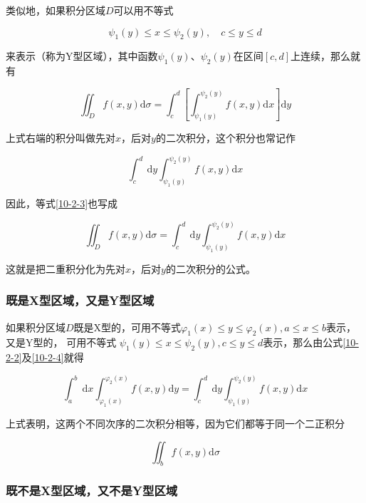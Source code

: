 \documentclass[12pt, a4paper]{article}
\numberwithin{equation}{section}
\begin{document}
    类似地，如果积分区域$D$可以用不等式
    
    $$
        \psi_1(y) \leq x \leq \psi_2(y), \quad c \leq y \leq d
    $$

    来表示（称为Y型区域），其中函数$\psi_1(y)$、$\psi_2(y)$在区间$[c, d]$上连续，那么就有

    \begin{equation}
        \iint_D f(x, y) \mathrm{d} \sigma=\int_c^d\left[\int_{\psi_1(y)}^{\psi_2(y)} f(x, y) \mathrm{d} x\right] \mathrm{d} y
        \label{10-2-3}
    \end{equation}

    上式右端的积分叫做先对$x$，后对$y$的二次积分，这个积分也常记作

    $$
        \int_c^d \mathrm{~d} y \int_{\psi_1(y)}^{\psi_2(y)} f(x, y) \mathrm{d} x
    $$

    因此，等式\ref{10-2-3}也写成

    \begin{equation}
        \iint_D f(x, y) \mathrm{d} \sigma=\int_c^d \mathrm{~d} y \int_{\psi_1(y)}^{\psi_2(y)} f(x, y) \mathrm{d} x
        \label{10-2-4}
    \end{equation}

    这就是把二重积分化为先对$x$，后对$y$的二次积分的公式。

\subsubsection{既是X型区域，又是Y型区域}

    如果积分区域$D$既是X型的，可用不等式$\varphi_1(x) \leq y \leq \varphi_2(x), a \leq x \leq b$表示，又是Y型的，
    可用不等式 $\psi_1(y) \leq x \leq \psi_2(y), c \leq y \leq d$表示，那么由公式\ref{10-2-2}及\ref{10-2-4}就得

    \begin{equation}
        \int_a^b \mathrm{~d} x \int_{\varphi_1(x)}^{\varphi_2(x)} f(x, y) \mathrm{d} y=\int_{c}^d \mathrm{~d} y \int_{\psi_1(y)}^{\psi_2(y)} f(x, y) \mathrm{d} x
    \end{equation}

    上式表明，这两个不同次序的二次积分相等，因为它们都等于同一个二正积分

    $$
        \iint_b f(x, y) \mathrm{d} \sigma
    $$

\subsubsection{既不是X型区域，又不是Y型区域}
\end{document}
